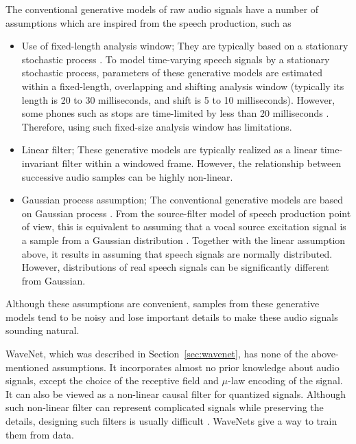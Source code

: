 \documentclass{article}
\begin{document}
The conventional generative models of raw audio signals have a number of assumptions which are inspired from the speech production, such as
\begin{itemize}
    \item Use of fixed-length analysis window; They are typically based on a stationary stochastic process \citep{LPC,UELS,Poritz_ARHMM_ICASSP82,Juang_MARHMM_ICASSP85,Kameoka_MultiKernelLPC_ASJ}.  To model time-varying speech signals by a stationary stochastic process, parameters of these generative models are estimated within a fixed-length, overlapping and shifting analysis window (typically its length is 20 to 30 milliseconds, and shift is 5 to 10 milliseconds).
    However, some phones such as stops are time-limited by less than 20 milliseconds \citep{Rabiner_ASR}.
    Therefore, using such fixed-size analysis window has limitations.
    \item Linear filter; These generative models are typically realized as a linear time-invariant filter  \citep{LPC,UELS,Poritz_ARHMM_ICASSP82,Juang_MARHMM_ICASSP85,Kameoka_MultiKernelLPC_ASJ} within a windowed frame.  However, the relationship between successive audio samples can be highly non-linear.
    \item Gaussian process assumption; The conventional generative models are based on Gaussian process \citep{LPC,UELS,Poritz_ARHMM_ICASSP82,Juang_MARHMM_ICASSP85,Kameoka_MultiKernelLPC_ASJ,Tokuda_CepLSTM_ICASSP2015,Tokuda_MixCepLSTM_ICASSP2016}.  From the source-filter model of speech production \citep{Chiba_SourceFilter,Fant_SourceFilter} point of view, this is equivalent to assuming that a vocal source excitation signal is a sample from a Gaussian distribution \citep{LPC,UELS,Poritz_ARHMM_ICASSP82,Juang_MARHMM_ICASSP85,Tokuda_CepLSTM_ICASSP2015,Kameoka_MultiKernelLPC_ASJ,Tokuda_MixCepLSTM_ICASSP2016}. 
    Together with the linear assumption above, it results in assuming that speech signals are normally distributed.
    However, distributions of real speech signals can be significantly different from Gaussian.
\end{itemize}
Although these assumptions are convenient, samples from these generative models tend to be noisy and lose important details to make these audio signals sounding natural.

WaveNet, which was described in Section~\ref{sec:wavenet}, has none of the above-mentioned assumptions.
It incorporates almost no prior knowledge about audio signals, except the choice of the receptive field and $\mu$-law encoding of the signal.
It can also be viewed as a non-linear causal filter for quantized signals.
Although such non-linear filter can represent complicated signals while preserving the details, designing such filters is usually difficult \citep{NonlinearFilterDesign}.
WaveNets give a way to train them from data.
\end{document}
